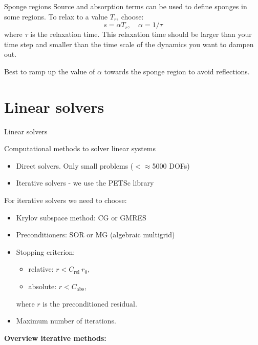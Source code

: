 \documentclass[12pt]{beamer}
\begin{document}
\begin{frame}{Sponge regions}
  Source and absorption terms can be used to define sponges in some regions. To relax to a value
  $T_r$, choose:
  \begin{equation*}
    s = \alpha T_r,\quad \alpha=1/\tau
  \end{equation*}
  where $\tau$ is the relaxation time. This relaxation time should be larger
  than your time step and smaller than the time scale of the dynamics you want
  to dampen out.
  
  Best to ramp up the value of $\alpha$ towards the sponge region
  to avoid reflections.
\end{frame}

\section{Linear solvers}
\begin{frame}{Linear solvers}
  \begin{block}{Computational methods to solver linear systems}
  \begin{itemize}
    \item Direct solvers. Only small problems ($<\approx$5000 DOFs)
    \item Iterative solvers - we use the PETSc library
  \end{itemize}
\end{block}

  For iterative solvers we need to choose:
  \begin{itemize}
    \item Krylov subspace method: CG or GMRES
    \item Preconditioners: SOR or MG (algebraic multigrid)
    \item Stopping criterion:
      \begin{itemize}
        \item relative:\;\; $r<C_{\text{rel}}~r_0$,
       \item absolute: $r<C_{\text{abs}}$,
      \end{itemize}
      where $r$ is the preconditioned residual.
    \item Maximum number of iterations.
  \end{itemize}

  {\small{\bf Overview iterative methods:} \citet{Saad1996}}
\end{frame}
\end{document}
